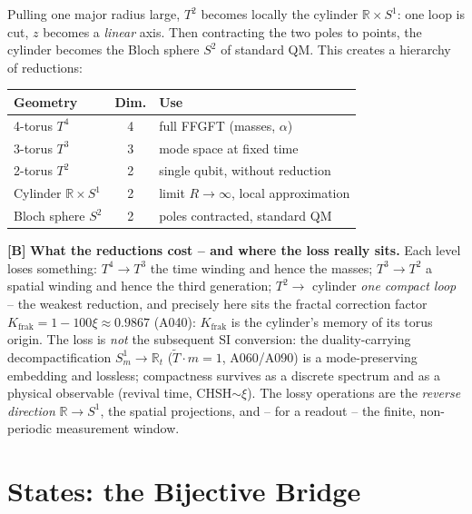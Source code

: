 Pulling one major radius large, $T^2$ becomes locally the cylinder
$\mathbb{R}\times S^1$: one loop is cut, $z$ becomes a \emph{linear} axis.
Then contracting the two poles to points, the cylinder becomes the Bloch sphere
$S^2$ of standard QM. This creates a hierarchy of reductions:

\begin{center}
\renewcommand{\arraystretch}{1.3}
{\small
\begin{tabular}{lcl}
\toprule
\textbf{Geometry} & \textbf{Dim.} & \textbf{Use} \\
\midrule
4-torus $T^4$ & 4 & full FFGFT (masses, $\alpha$) \\
3-torus $T^3$ & 3 & mode space at fixed time \\
2-torus $T^2$ & 2 & single qubit, without reduction \\
Cylinder $\mathbb{R}\times S^1$ & 2 & limit $R\to\infty$, local approximation \\
Bloch sphere $S^2$ & 2 & poles contracted, standard QM \\
\bottomrule
\end{tabular}
}
\renewcommand{\arraystretch}{1.0}
\end{center}

\textbf{[B]} \textbf{What the reductions cost -- and where the loss really sits.}
Each level loses something: $T^4\to T^3$ the time winding and hence the masses;
$T^3\to T^2$ a spatial winding and hence the third generation; $T^2\to$ cylinder
\emph{one compact loop} -- the weakest reduction, and precisely here sits the
fractal correction factor $K_{\text{frak}} = 1-100\xi \approx 0{.}9867$ (A040):
$K_{\text{frak}}$ is the cylinder's memory of its torus origin. The loss is
\emph{not} the subsequent SI conversion: the duality-carrying decompactification
$S^1_m\to\mathbb{R}_t$ ($\tilde T\cdot m=1$, A060/A090) is a mode-preserving
embedding and lossless; compactness survives as a discrete spectrum and as a
physical observable (revival time, CHSH$\sim\xi$). The lossy operations are the
\emph{reverse direction} $\mathbb{R}\to S^1$, the spatial projections, and -- for
a readout -- the finite, non-periodic measurement window.

\section{States: the Bijective Bridge}

